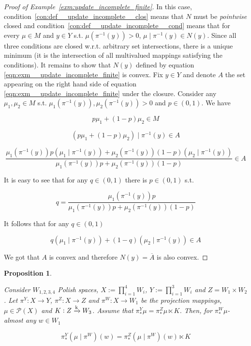 \documentclass[aop,preprint]{imsart}
\numberwithin{equation}{section}
\theoremstyle{definition}
\theoremstyle{plain}
\newtheorem{proposition}{Proposition}[section]
\newcommand{\M}{\xrightarrow{\textnormal{k}}}
\newcommand{\PM}{\mathcal{P}}
\begin{document}
\begin{proof}[Proof of Example~\ref{exm:update_incomplete_finite}]

In this case, condition~\ref{con:def__update_incomplete__clos} means that $N$ must be \emph{pointwise} closed and condition~\ref{con:def__update_incomplete__cond} means that for every $\mu \in M$ and $y \in Y$ s.t. $\mu\left(\pi^{-1}(y)\right) > 0$, $\mu \mid \pi^{-1}(y) \in N(y)$. Since all three conditions are closed w.r.t. arbitrary set intersections, there is a unique minimum (it is the intersection of all multivalued mappings satisfying the conditions). It remains to show that $N(y)$ defined by equation \ref{eqn:exm__update_incomplete_finite} is convex. Fix $y \in Y$ and denote $A$ the set appearing on the right hand side of equation \ref{eqn:exm__update_incomplete_finite} under the closure. Consider any $\mu_1,\mu_2 \in M$ s.t. $\mu_1\left(\pi^{-1}(y)\right),\mu_2\left(\pi^{-1}(y)\right) > 0$ and $p \in (0,1)$. We have 

\[p\mu_1+(1-p)\mu_2 \in M\]

\[\left(p\mu_1+(1-p)\mu_2\right) \mid \pi^{-1}(y) \in A\]

\[\frac{\mu_1\left(\pi^{-1}(y)\right)p\left(\mu_1\mid \pi^{-1}(y)\right)+\mu_2\left(\pi^{-1}(y)\right)(1-p)\left(\mu_2\mid \pi^{-1}(y)\right)}{\mu_1\left(\pi^{-1}(y)\right)p+\mu_2\left(\pi^{-1}(y)\right)(1-p)} \in A\]

It is easy to see that for any $q \in (0,1)$ there is $p \in (0,1)$ s.t.

\[q = \frac{\mu_1\left(\pi^{-1}(y)\right)p}{\mu_1\left(\pi^{-1}(y)\right)p+\mu_2\left(\pi^{-1}(y)\right)(1-p)}\]

It follows that for any $q \in (0,1)$

\[q\left(\mu_1\mid \pi^{-1}(y)\right)+(1-q)\left(\mu_2\mid \pi^{-1}(y)\right) \in A\]

We got that $A$ is convex and therefore $N(y)=\overline{A}$ is also convex.
\end{proof}

\begin{samepage}
\begin{proposition}
\label{prp:four_factors}

Consider $W_{1,2,3,4}$ Polish spaces, $X:=\prod_{i=1}^4 W_i$, $Y:=\prod_{i=1}^3 W_i$ and $Z = W_1 \times W_2$. Let $\pi^Y: X \rightarrow Y$, $\pi^Z: X \rightarrow Z$ and $\pi^W: X \rightarrow W_1$ be the projection mappings, $\mu \in \PM(X)$ and $K: Z \M W_3$. Assume that $\pi^Y_* \mu = \pi^Z_*\mu \ltimes K$. Then, for $\pi^W_* \mu$-almost any $w \in W_1$

\begin{equation}
\pi^Y_* \left(\mu \mid \pi^W\right)(w) = \pi^Z_* \left(\mu \mid \pi^W\right)(w) \ltimes K
\end{equation}

\end{proposition}
\end{samepage}
\end{document}
